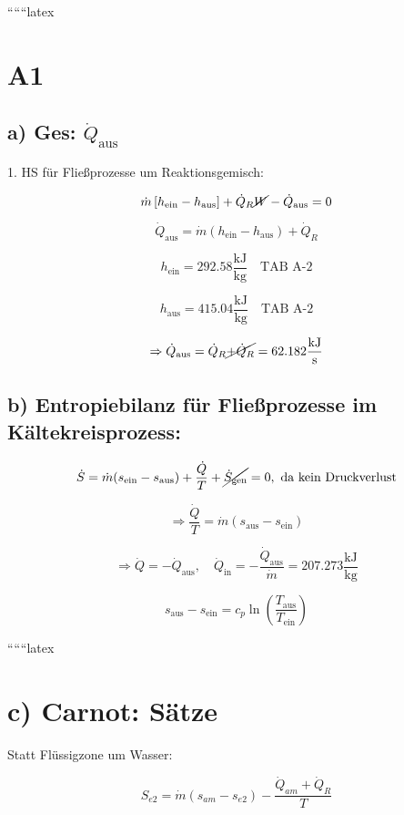 
``````latex

\section*{A1}

\subsection*{a) Ges: $\dot{Q}_{\text{aus}}$}

1. HS für Fließprozesse um Reaktionsgemisch:

\[
\dot{m} \left[ h_{\text{ein}} - h_{\text{aus}} \right] + \dot{Q}_R \cancel{W} - \dot{Q}_{\text{aus}} = 0
\]

\[
\dot{Q}_{\text{aus}} = \dot{m} (h_{\text{ein}} - h_{\text{aus}}) + \dot{Q}_R
\]

\[
h_{\text{ein}} = 292.58 \frac{\text{kJ}}{\text{kg}} \quad \text{TAB A-2}
\]

\[
h_{\text{aus}} = 415.04 \frac{\text{kJ}}{\text{kg}} \quad \text{TAB A-2}
\]

\[
\Rightarrow \dot{Q}_{\text{aus}} = \dot{Q}_R \cancel{+ \dot{Q}_R} = 62.182 \frac{\text{kJ}}{\text{s}}
\]

\subsection*{b) Entropiebilanz für Fließprozesse im Kältekreisprozess:}

\[
\dot{S} = \dot{m} (s_{\text{ein}} - s_{\text{aus}}) + \frac{\dot{Q}}{T} + \cancel{\dot{S}_{\text{gen}}} = 0, \text{ da kein Druckverlust}
\]

\[
\Rightarrow \frac{\dot{Q}}{T} = \dot{m} (s_{\text{aus}} - s_{\text{ein}})
\]

\[
\Rightarrow \dot{Q} = -\dot{Q}_{\text{aus}}, \quad \dot{Q}_{\text{in}} = -\frac{\dot{Q}_{\text{aus}}}{\dot{m}} = 207.273 \frac{\text{kJ}}{\text{kg}}
\]

\[
s_{\text{aus}} - s_{\text{ein}} = c_p \ln \left( \frac{T_{\text{aus}}}{T_{\text{ein}}} \right)
\]

``````latex

\section*{c) Carnot: Sätze}

Statt Flüssigzone um Wasser:

\[
S_{e2} = \dot{m} (s_{am} - s_{e2}) - \frac{\dot{Q}_{am} + \dot{Q}_R}{T}
\]


